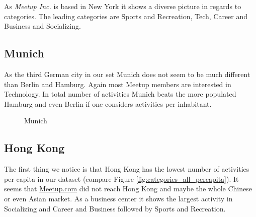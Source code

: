 As \emph{Meetup Inc.} is based in New York it shows a diverse picture in regards to categories. The leading categories are Sports and Recreation, Tech, Career and Business and Socializing. 

\subsection*{Munich}

As the third German city in our set Munich does not seem to be much different than Berlin and Hamburg. Again most Meetup members are interested in Technology. In total number of activities Munich beats the more populated Hamburg and even Berlin if one considers activities per inhabitant. 

\begin{figure}[!htp]
	\hfill
	\caption{Munich}
\end{figure}

\subsection*{Hong Kong}

The first thing we notice is that Hong Kong has the lowest number of activities per capita in our dataset (compare Figure \ref{fig:categories_all_percapita}). It seems that \url{Meetup.com} did not reach Hong Kong and maybe the whole Chinese or even Asian market. 
As a business center it shows the largest activity in Socializing and Career and Business followed by Sports and Recreation. 

